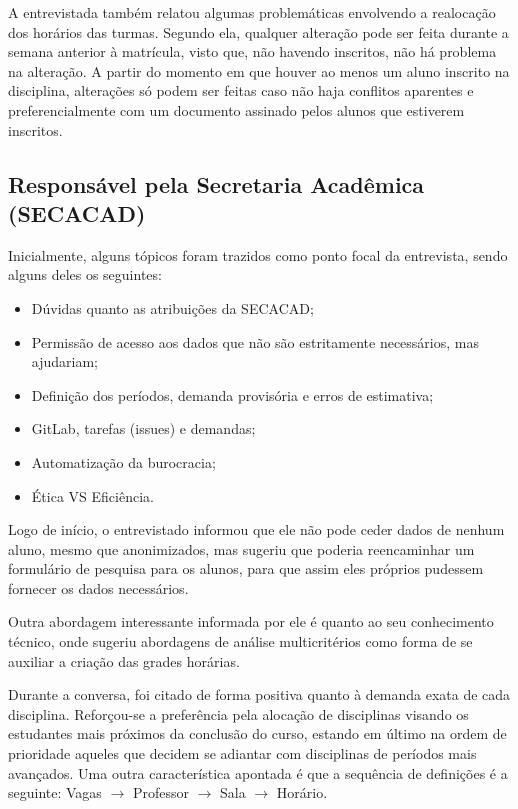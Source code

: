 A entrevistada também relatou algumas problemáticas envolvendo a realocação dos horários das turmas. Segundo ela, qualquer alteração pode ser feita durante a semana anterior à matrícula, visto que, não havendo inscritos, não há problema na alteração. A partir do momento em que houver ao menos um aluno inscrito na disciplina, alterações só podem ser feitas caso não haja conflitos aparentes e preferencialmente com um documento assinado pelos alunos que estiverem inscritos.

\subsection{Responsável pela Secretaria Acadêmica (SECACAD)} \label{ssec:3_Responsável} %

Inicialmente, alguns tópicos foram trazidos como ponto focal da entrevista, sendo alguns deles os seguintes:

\begin{itemize}
  \item Dúvidas quanto as atribuições da SECACAD;
  \item Permissão de acesso aos dados que não são estritamente necessários, mas ajudariam;
  \item Definição dos períodos, demanda provisória e erros de estimativa;
  \item GitLab, tarefas (issues) e demandas;
  \item Automatização da burocracia;
  \item Ética VS Eficiência.
\end{itemize}

Logo de início, o entrevistado informou que ele não pode ceder dados de nenhum aluno, mesmo que anonimizados, mas sugeriu que poderia reencaminhar um formulário de pesquisa para os alunos, para que assim eles próprios pudessem fornecer os dados necessários.

Outra abordagem interessante informada por ele é quanto ao seu conhecimento técnico, onde sugeriu abordagens de análise multicritérios como forma de se auxiliar a criação das grades horárias.

Durante a conversa, foi citado de forma positiva quanto à demanda exata de cada disciplina. Reforçou-se a preferência pela alocação de disciplinas visando os estudantes mais próximos da conclusão do curso, estando em último na ordem de prioridade aqueles que decidem se adiantar com disciplinas de períodos mais avançados. Uma outra característica apontada é que a sequência de definições é a seguinte: Vagas $\rightarrow$ Professor $\rightarrow$ Sala $\rightarrow$ Horário.

